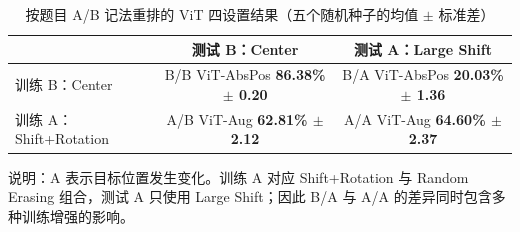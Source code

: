 \begin{table}[H]
  \centering
  \caption{按题目 A/B 记法重排的 ViT 四设置结果（五个随机种子的均值 $\pm$ 标准差）}
  \label{tab:ab-protocol-matrix}
  \renewcommand{\arraystretch}{1.15}
  \begin{tabular}{lcc}
    \toprule
      & 测试 B：Center & 测试 A：Large Shift \\
    \midrule
    训练 B：Center
      & \fcolorbox{PVBorder}{PVBlueLight}{\parbox[c][1.35cm][c]{0.22\textwidth}{\centering B/B\\ViT-AbsPos\\\textbf{86.38\% $\pm$ 0.20}}}
      & \fcolorbox{PVBorder}{PVGoldLight}{\parbox[c][1.35cm][c]{0.22\textwidth}{\centering B/A\\ViT-AbsPos\\\textbf{20.03\% $\pm$ 1.36}}} \\
    \addlinespace[0.35em]
    训练 A：Shift+Rotation
      & \fcolorbox{PVBorder}{PVTealLight}{\parbox[c][1.35cm][c]{0.22\textwidth}{\centering A/B\\ViT-Aug\\\textbf{62.81\% $\pm$ 2.12}}}
      & \fcolorbox{PVBorder}{PVGreenLight}{\parbox[c][1.35cm][c]{0.22\textwidth}{\centering A/A\\ViT-Aug\\\textbf{64.60\% $\pm$ 2.37}}} \\
    \bottomrule
  \end{tabular}

  \vspace{0.45em}
  \parbox{0.92\textwidth}{\footnotesize\textcolor{PVMuted}{说明：A 表示目标位置发生变化。训练 A 对应 Shift+Rotation 与 Random Erasing 组合，测试 A 只使用 Large Shift；因此 B/A 与 A/A 的差异同时包含多种训练增强的影响。}}
\end{table}
